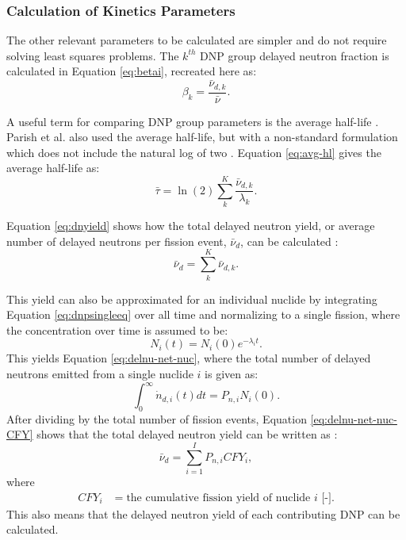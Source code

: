 \subsubsection{Calculation of Kinetics Parameters}
\label{sec:calc-kinetic-param}

The other relevant parameters to be calculated are simpler and do not require solving least squares problems.
The $k^{th}$ \gls{DNP} group delayed neutron fraction is calculated in Equation \eqref{eq:betai}, recreated here as:
\begin{equation}
    \beta_k = \frac{\bar{\nu}_{d, k}}{\bar{\nu}}.
    \nonumber
\end{equation}

A useful term for comparing \gls{DNP} group parameters is the average half-life \cite{piksaikin2002energy, piksaikin2007relative, leconte2020new}.
Parish et al. also used the average half-life, but with a non-standard formulation which does not include the natural log of two \cite{parish1999status}.
Equation \eqref{eq:avg-hl} gives the average half-life as:
\begin{equation}
    \bar{\tau} = \ln (2) \sum_k^{K} \frac{\bar{\nu}_{d, k}}{\lambda_k}.
    \label{eq:avg-hl}
\end{equation}

Equation \eqref{eq:dnyield} shows how the total delayed neutron yield, or average number of delayed neutrons per fission event, $\bar{\nu}_d$, can be calculated \cite{gremyachkin2015verification}:
\begin{equation}
    \bar{\nu}_d = \sum_k^K \bar{\nu}_{d, k}.
    \label{eq:dnyield}    
\end{equation}

This yield can also be approximated for an individual nuclide by integrating Equation \eqref{eq:dnpsingleeq} over all time and normalizing to a single fission, where the concentration over time is assumed to be: 
\begin{equation}
    N_{i}(t) = N_i(0) e^{-\lambda_i t}.
    \label{eq:conc-time}
\end{equation}
This yields Equation \eqref{eq:delnu-net-nuc}, where the total number of delayed neutrons emitted from a single nuclide $i$ is given as:
\begin{equation}
    \int_0^{\infty} \dot{n}_{d, i}(t) dt= P_{n, i} N_{i} (0).
    \label{eq:delnu-net-nuc}
\end{equation}
After dividing by the total number of fission events, Equation \eqref{eq:delnu-net-nuc-CFY} shows that the total delayed neutron yield can be written as \cite{huynh2014calculation, mathieu2012new}:
\begin{equation}
    \bar{\nu}_d = \sum_{i=1}^I P_{n, i} CFY_i,
    \label{eq:delnu-net-nuc-CFY}
\end{equation}
where
\begin{align}
    CFY_i &= \text{the cumulative fission yield of nuclide $i$ [-]}. \nonumber
\end{align}
This also means that the delayed neutron yield of each contributing \gls{DNP} can be calculated.


